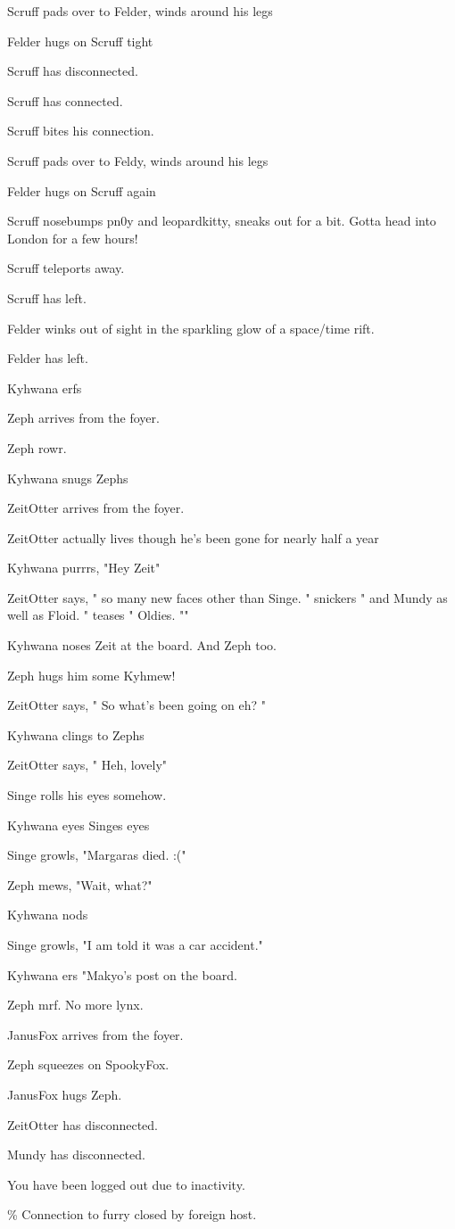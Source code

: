 \begin{hangparas}{2em}{1}
Scruff pads over to Felder, winds around his legs

Felder hugs on Scruff tight

Scruff has disconnected.

Scruff has connected.

Scruff bites his connection.

Scruff pads over to Feldy, winds around his legs

Felder hugs on Scruff again

Scruff nosebumps pn0y and leopardkitty, sneaks out for a bit. Gotta head into London for a few hours!

Scruff teleports away.

Scruff has left.

Felder winks out of sight in the sparkling glow of a space/time rift.

Felder has left.

Kyhwana erfs

Zeph arrives from the foyer.

Zeph rowr.

Kyhwana snugs Zephs

ZeitOtter arrives from the foyer.

ZeitOtter actually lives though he's been gone for nearly half a year

Kyhwana purrrs, "Hey Zeit"

ZeitOtter says, " so many new faces other than Singe. " snickers " and Mundy as well as Floid. " teases " Oldies. ""

Kyhwana noses Zeit at the board. And Zeph too.

Zeph hugs him some Kyhmew!

ZeitOtter says, " So what's been going on eh? "

Kyhwana clings to Zephs

ZeitOtter says, " Heh, lovely"

Singe rolls his eyes somehow.

Kyhwana eyes Singes eyes

Singe growls, "Margaras died. :("

Zeph mews, "Wait, what?"

Kyhwana nods

Singe growls, "I am told it was a car accident."

Kyhwana ers "Makyo's post on the board.

Zeph mrf. No more lynx.

JanusFox arrives from the foyer.

Zeph squeezes on SpookyFox.

JanusFox hugs Zeph.

ZeitOtter has disconnected.

Mundy has disconnected.

You have been logged out due to inactivity.

\% Connection to furry closed by foreign host.
\end{hangparas}

